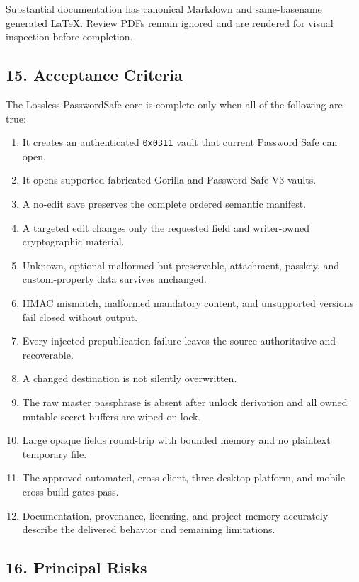 \documentclass[
  letterpaper,
]{article}
\newcommand{\passthrough}[1]{#1}
\providecommand{\tightlist}{%
  \setlength{\itemsep}{0pt}\setlength{\parskip}{0pt}}
\begin{document}
Substantial documentation has canonical Markdown and same-basename generated LaTeX. Review PDFs remain ignored and are
rendered for visual inspection before completion.

\subsection{15. Acceptance Criteria}\label{15-acceptance-criteria}

The Lossless PasswordSafe core is complete only when all of the following are true:

\begin{enumerate}
\def\labelenumi{\arabic{enumi}.}
\tightlist
\item
  It creates an authenticated \passthrough{\lstinline!0x0311!} vault that current Password Safe can open.
\item
  It opens supported fabricated Gorilla and Password Safe V3 vaults.
\item
  A no-edit save preserves the complete ordered semantic manifest.
\item
  A targeted edit changes only the requested field and writer-owned cryptographic material.
\item
  Unknown, optional malformed-but-preservable, attachment, passkey, and custom-property data survives unchanged.
\item
  HMAC mismatch, malformed mandatory content, and unsupported versions fail closed without output.
\item
  Every injected prepublication failure leaves the source authoritative and recoverable.
\item
  A changed destination is not silently overwritten.
\item
  The raw master passphrase is absent after unlock derivation and all owned mutable secret buffers are wiped on lock.
\item
  Large opaque fields round-trip with bounded memory and no plaintext temporary file.
\item
  The approved automated, cross-client, three-desktop-platform, and mobile cross-build gates pass.
\item
  Documentation, provenance, licensing, and project memory accurately describe the delivered behavior and remaining
  limitations.
\end{enumerate}

\subsection{16. Principal Risks}\label{16-principal-risks}
\end{document}
